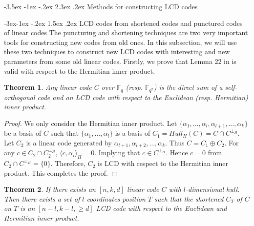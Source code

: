 \documentclass[12pt,twoside]{article}
\makeatletter
\renewcommand\section{\@startsection {section}{1}{\z@}%
                                   {-3.5ex \@plus -1ex \@minus -.2ex}%
                                   {2.3ex \@plus.2ex}%
                                   {\normalfont\large\bfseries}}
\renewcommand\subsection{\@startsection{subsection}{2}{\z@}%
                                     {-3ex\@plus -1ex \@minus -.2ex}%
                                     {1.5ex \@plus .2ex}%
                                     {\normalfont\normalsize\bfseries}}
\newcommand{\F}{\mathbb{F}}
\theoremstyle{plain}
\newtheorem{theorem}{Theorem}[section]
\theoremstyle{definition}
\theoremstyle{remark}
\makeatother
\begin{document}
\section{Methods for constructing LCD codes}

\subsection{LCD codes from shortened codes and punctured codes of linear codes}
The puncturing and shortening techniques are two very important tools for constructing new codes from old ones. In this subsection, we will use these two techniques to construct
new LCD codes with interesting and new parameters from some old linear codes.
Firstly, we prove that Lemma 22 in \cite{LCD-3} is valid with respect to the Hermitian inner product.



\begin{theorem}\label{thm-SO+LCD}
Any linear code $C$ over $\F_q$ (resp. $\F_{q^2}$) is the direct sum of a self-orthogonal code and an LCD code with respect to the Euclidean (resp. Hermitian) inner product.
\end{theorem}

\begin{proof}
We only consider the Hermitian inner product.
Let $\{\alpha_1,\ldots,\alpha_l,\alpha_{l+1},\ldots,\alpha_k\}$ be a basis of $C$ such that
$\{\alpha_1,\ldots,\alpha_l\}$ is a basis of $C_1=Hull_H(C)=C\cap C^{\perp_H}$.
Let $C_2$ is a linear code generated by $\alpha_{l+1},\alpha_{l+2},\ldots,\alpha_{k}$.
Thus $C=C_1\oplus C_2$.
For any $c\in C_2\cap C_2^{\perp_H}$, $\langle c, \alpha_i\rangle_H=0$. Implying that $c\in C^{\perp_H}$. Hence $c=0$ from $C_2\cap C^{\perp_H}=\{0\}$. Therefore, $C_2$ is LCD with respect to the Hermitian inner product.
This completes the proof.
\end{proof}

\begin{theorem}\label{LCD-(n-l,k-l)}
If there exists an $[n,k,d]$ linear code $C$ with $l$-dimensional hull. Then there exists a set of $l$ coordinates position $T$ such that the shortened $C_T$ of $C$ on $T$ is an $[n-l,k-l,\geq d]$ LCD code with respect to the Euclidean and Hermitian inner product.
\end{theorem}
\end{document}
